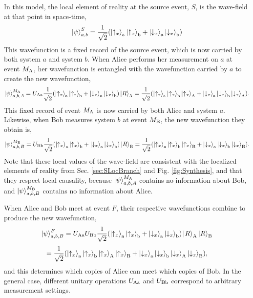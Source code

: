\documentclass[a4paper]{article}
\begin{document}
In this model, the local element of reality at the source event, $S$, is the wave-field at that point in space-time,
 \begin{equation}
\Ket{\psi}^S_{a,b} =\frac{1}{\sqrt 2}(\Ket{\uparrow_x}_{\rm a}\Ket{\uparrow_x}_{\rm b}+
\Ket{\downarrow_x}_{\rm a}\Ket{\downarrow_x}_{\rm b})
\end{equation}
This wavefunction is a fixed record of the source event, which is now carried by both system $a$ and system $b$.  When Alice performs her measurement on $a$ at event $M_{\rm A}$, her wavefunction is entangled with the wavefunction carried by $a$ to create the new wavefunction, 
\begin{equation}
\Ket{\psi}^{M_{\rm A}}_{a,b, A} =U_{\rm Aa} \frac{1}{\sqrt 2}(\Ket{\uparrow_x}_{\rm a}\Ket{\uparrow_x}_{\rm b}+
\Ket{\downarrow_x}_{\rm a}\Ket{\downarrow_x}_{\rm b})\Ket{R}_{\rm A} = \frac{1}{\sqrt 2}(\Ket{\uparrow_x}_{\rm a}\Ket{\uparrow_x}_{\rm b}\Ket{\uparrow_x}_{\rm A}+
\Ket{\downarrow_x}_{\rm a}\Ket{\downarrow_x}_{\rm b}\Ket{\downarrow_x}_{\rm A}).
\end{equation}
This fixed record of event $M_{\rm A}$ is now carried by both Alice and system $a$.  Likewise, when Bob measures system $b$ at event $M_{\rm B}$, the new wavefunction they obtain is, 
\begin{equation}
\Ket{\psi}^{M_{\rm B}}_{a,b, B} =U_{\rm Bb} \frac{1}{\sqrt 2}(\Ket{\uparrow_x}_{\rm a}\Ket{\uparrow_x}_{\rm b}+
\Ket{\downarrow_x}_{\rm a}\Ket{\downarrow_x}_{\rm b})\Ket{R}_{\rm B} = \frac{1}{\sqrt 2}(\Ket{\uparrow_x}_{\rm a}\Ket{\uparrow_x}_{\rm b}\Ket{\uparrow_x}_{\rm B}+
\Ket{\downarrow_x}_{\rm a}\Ket{\downarrow_x}_{\rm b}\Ket{\downarrow_x}_{\rm B}).
\end{equation}
Note that these local values of the wave-field are consistent with the localized elements of reality from Sec. \ref{sec:SLocBranch} and Fig. \ref{fig:Synthesis}, and that they respect local causality, because $\Ket{\psi}^{M_{\rm A}}_{a,b, A}$ contains no information about Bob, and $\Ket{\psi}^{M_{\rm B}}_{a,b, B}$ contains no information about Alice.

When Alice and Bob meet at event $F$, their respective wavefunctions combine to produce the new wavefunction,
\begin{equation}
\Ket{\psi}^{F}_{a,b, B} =U_{\rm Aa}U_{\rm Bb} \frac{1}{\sqrt 2}(\Ket{\uparrow_x}_{\rm a}\Ket{\uparrow_x}_{\rm b}+
\Ket{\downarrow_x}_{\rm a}\Ket{\downarrow_x}_{\rm b})\Ket{R}_{\rm A}\Ket{R}_{\rm B} \label{PsiF}
\end{equation}
\begin{equation}
= \frac{1}{\sqrt 2}(\Ket{\uparrow_x}_{\rm a}\Ket{\uparrow_x}_{\rm b}\Ket{\uparrow_x}_{\rm A}\Ket{\uparrow_x}_{\rm B}+
\Ket{\downarrow_x}_{\rm a}\Ket{\downarrow_x}_{\rm b}\Ket{\downarrow_x}_{\rm A}\Ket{\downarrow_x}_{\rm B}),\nonumber
\end{equation}
and this determines which copies of Alice can meet which copies of Bob.  In the general case, different unitary operations $U_{\rm Aa}$ and $U_{\rm Bb}$ correspond to arbitrary measurement settings.
\end{document}
